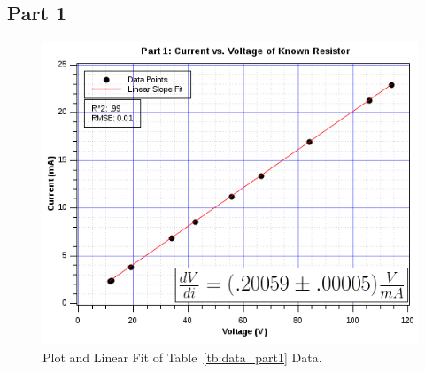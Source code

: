 \documentclass[twocolumn,english]{IEEEtran}
\theoremstyle{plain}
\theoremstyle{plain}
\begin{document}
\subsection*{Part 1}
  \begin{figure}[H]
  \begin{centering}
  \begin{center}
  \includegraphics[width=\linewidth]{./Pictures/part1graph.png}
  \caption{Plot and Linear Fit of Table~\ref{tb:data_part1} Data.}
  \label{fig:graph_part1}
  \end{center}
  \par\end{centering}
  \end{figure}
\end{document}
